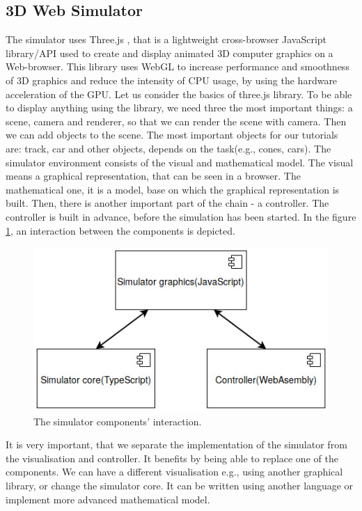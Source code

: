 \subsection{3D Web Simulator}
The simulator uses Three.js \cite{ThreeJS}, that is a lightweight cross-browser JavaScript library/API used to create and display animated 3D computer graphics on a Web-browser. This library uses WebGL \cite{WebGL} to increase performance and smoothness of 3D graphics and reduce the intensity of CPU usage, by using the hardware acceleration of the GPU.\newline
Let us consider the basics of three.js library. To be able to display anything using the library, we need three the most important things: a scene, camera and renderer, so that we can render the scene with camera. Then we can add objects to the scene. The most important objects for our tutorials are: track, car and other objects, depends on the task(e.g., cones, cars).\newline
The simulator environment consists of the visual and mathematical model. The visual means a graphical representation, that can be seen in a browser. The mathematical one, it is a model, base on which the graphical representation is built. Then, there is another important part of the chain - a controller. The controller is built in advance, before the simulation has been started. In the figure \ref{fig:simulator-scheme}, an interaction between the components is depicted.
\begin{figure}[h!]
    \centering
    \includegraphics[width=0.7\linewidth]{src/pic/simulator-scheme}
    \caption{The simulator components' interaction.}
    \label{fig:simulator-scheme}
\end{figure} \newline
It is very important, that we separate the implementation of the simulator from the visualisation and controller. It benefits by being able to replace one of the components. We can have a different visualisation e.g., using another graphical library, or change the simulator core. It can be written using another language or implement more advanced mathematical model. 


